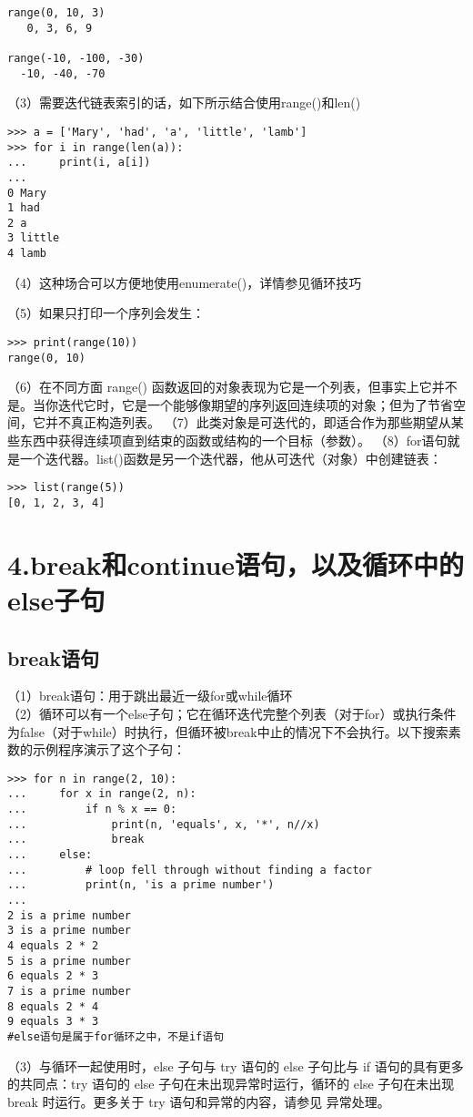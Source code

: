 \documentclass{article}
\begin{document}
\begin{CJK}{UTF8}{gbsn}
\begin{verbatim}
range(0, 10, 3)
   0, 3, 6, 9

range(-10, -100, -30)
  -10, -40, -70
\end{verbatim}
（3）需要迭代链表索引的话，如下所示结合使用range()和len()
\begin{verbatim}
>>> a = ['Mary', 'had', 'a', 'little', 'lamb']
>>> for i in range(len(a)):
...     print(i, a[i])
...
0 Mary
1 had
2 a
3 little
4 lamb
\end{verbatim}
（4）这种场合可以方便地使用enumerate()，详情参见循环技巧

（5）如果只打印一个序列会发生：
\begin{verbatim}
>>> print(range(10))
range(0, 10)
\end{verbatim}
（6）在不同方面 range() 函数返回的对象表现为它是一个列表，但事实上它并不是。当你迭代它时，它是一个能够像期望的序列返回连续项的对象；但为了节省空间，它并不真正构造列表。
（7）此类对象是可迭代的，即适合作为那些期望从某些东西中获得连续项直到结束的函数或结构的一个目标（参数）。
（8）for语句就是一个迭代器。list()函数是另一个迭代器，他从可迭代（对象）中创建链表：
\begin{verbatim}
>>> list(range(5))
[0, 1, 2, 3, 4]
\end{verbatim}
\section*{4.break和continue语句，以及循环中的else子句}
\subsection*{break语句}
（1）break语句：用于跳出最近一级for或while循环\\
（2）循环可以有一个else子句；它在循环迭代完整个列表（对于for）或执行条件为false（对于while）时执行，但循环被break中止的情况下不会执行。以下搜索素数的示例程序演示了这个子句：
\begin{verbatim}
>>> for n in range(2, 10):
...     for x in range(2, n):
...         if n % x == 0:
...             print(n, 'equals', x, '*', n//x)
...             break
...     else:
...         # loop fell through without finding a factor
...         print(n, 'is a prime number')
...
2 is a prime number
3 is a prime number
4 equals 2 * 2
5 is a prime number
6 equals 2 * 3
7 is a prime number
8 equals 2 * 4
9 equals 3 * 3
#else语句是属于for循环之中，不是if语句
\end{verbatim}
（3）与循环一起使用时，else 子句与 try 语句的 else 子句比与 if 语句的具有更多的共同点：try 语句的 else 子句在未出现异常时运行，循环的 else 子句在未出现 break 时运行。更多关于 try 语句和异常的内容，请参见 异常处理。

\end{CJK}
\end{document}
